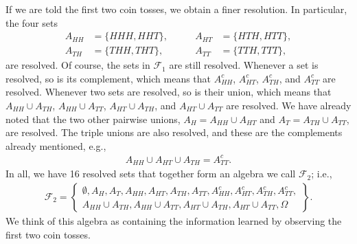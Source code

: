 \documentclass[\topdir/lecture\_notes.tex]{subfiles}
\begin{document}
\begin{optional}
\begin{example}
If we are told the first two coin tosses, we obtain a finer resolution. In particular, the four sets
\begin{equation*}
\begin{split}
A_{H H}&=\{H H H, H H T\}, \\
A_{T H}&=\{T H H, T H T\},
\end{split}
\quad \quad
\begin{split}
A_{H T}&=\{H T H, H T T\},  \\
A_{T T}&=\{T T H, T T T\},
\end{split}
\end{equation*}
are resolved. Of course, the sets in $\mathcal{F}_{1}$ are still resolved. Whenever a set is resolved, so is its complement, which means that $A_{H H}^{c}$, $A_{H T}^{c}$, $ A_{T H}^{c}$, and $A_{T T}^{c}$ are resolved. Whenever two sets are resolved, so is their union, which means that $A_{H H} \cup A_{T H}$, $ A_{H H} \cup A_{T T}$, $ A_{H T} \cup A_{T H}$, and $A_{H T} \cup A_{T T}$ are resolved. We have already noted that the two other pairwise unions, $A_{H}=A_{H H} \cup A_{H T}$ and $A_{T}=A_{T H} \cup A_{T T}$, are resolved. The triple unions are also resolved, and these are the complements already mentioned, e.g.,
\begin{align*}
A_{H H} \cup A_{H T} \cup A_{T H}=A_{T T}^{c}.
\end{align*}
In all, we have 16 resolved sets that together form an algebra we call $\mathcal{F}_{2}$; i.e.,
\begin{align*}
\mathcal{F}_{2}=\left\{\begin{array}{l}
\emptyset, A_{H}, A_{T}, A_{H H}, A_{H T}, A_{T H}, A_{T T}, A_{H H}^{c}, A_{H T}^{c}, A_{T H}^{c}, A_{T T}^{c},  \tag{2.1.3}\\
A_{H H} \cup A_{T H}, A_{H H} \cup A_{T T}, A_{H T} \cup A_{T H}, A_{H T} \cup A_{T T}, \Omega
\end{array}\right\} .
\end{align*}
We think of this algebra as containing the information learned by observing the first two coin tosses.


\end{example}
\end{optional}
\end{document}
